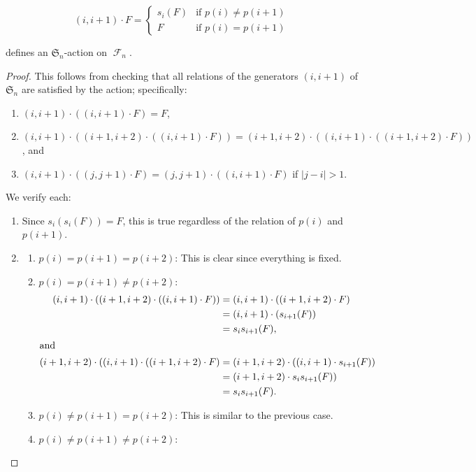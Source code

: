 \documentclass[10pt,a4paper]{amsart}
\DeclareMathOperator{\F}{\mathcal{F}}
\renewcommand{\S}{\mathfrak{S}}
\begin{document}
\begin{equation}\label{def: sn action on forests}
    (i,i+1)\cdot F=\begin{cases}
       s_i(F)&\mbox{if }p(i)\neq p(i+1)\\
       F&\mbox{if }p(i)=p(i+1)
    \end{cases}
\end{equation}

\begin{lemma}
     defines an $\S_n$-action on $\F_n$.
\end{lemma}

\begin{proof}
    This follows from checking that all relations of the generators $(i,i+1)$ of $\S_n$ are satisfied by the action; specifically:
    \begin{enumerate}
    \item $ (i,i+1)\cdot ( (i,i+1)\cdot F)=F$,
    \item $ (i,i+1)\cdot ( (i+1,i+2)\cdot ( (i,i+1)\cdot F))= (i+1,i+2)\cdot ( (i,i+1)\cdot ( (i+1,i+2)\cdot F))$, and
    \item $(i,i+1)\cdot ((j,j+1)\cdot F)=(j,j+1)\cdot ((i,i+1)\cdot F)$ if $|j-i|>1$.
\end{enumerate}
We verify each:
\begin{enumerate}
    \item Since $s_i(s_i(F))=F$, this is true regardless of the relation of $p(i)$ and $p(i+1)$.
    \item 
\begin{enumerate}
    \item $p(i)=p(i+1)=p(i+2)$: This is clear since everything is fixed.
    \item $p(i)=p(i+1)\neq p(i+2)$: 
    \begin{align*}  
   (i,i+1)\cdot ( (i+1,i+2)\cdot ( (i,i+1)\cdot F))&=(i,i+1)\cdot ( (i+1,i+2) \cdot F)\\
   &=(i,i+1)\cdot ( s_{i+1}(F))\\
   &=s_is_{i+1}(F),\\
   \intertext{and}
    (i+1,i+2)\cdot ( (i,i+1)\cdot ( (i+1,i+2)\cdot F)&=(i+1,i+2)\cdot ( (i,i+1)\cdot s_{i+1}(F))\\
    &=(i+1,i+2)\cdot s_i s_{i+1}(F))\\
    &=s_is_{i+1}(F).\end{align*}
    \item  $p(i)\neq p(i+1)= p(i+2)$: This is similar to the previous case.
    \item $p(i)\neq p(i+1)\neq p(i+2)$:

\end{enumerate}
\end{enumerate}
\end{proof}
\end{document}
